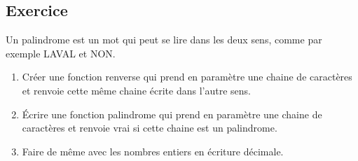 \documentclass[11pt,a4paper]{article}
\newcounter{numexo}
\begin{document}


\addtocounter{numexo}{1}
\subsection*{\Large Exercice \thenumexo }
Un palindrome est un mot qui peut se lire dans les deux sens, comme par exemple LAVAL et NON.
\begin{enumerate}
\item Créer une fonction renverse qui prend en paramètre une chaine de caractères et renvoie cette même chaine écrite dans l'autre sens.
\item Écrire une fonction palindrome qui prend en paramètre une chaine de caractères et renvoie vrai si cette chaine est un palindrome.
\item Faire de même avec les nombres entiers en écriture décimale.
\end{enumerate}
\end{document}
